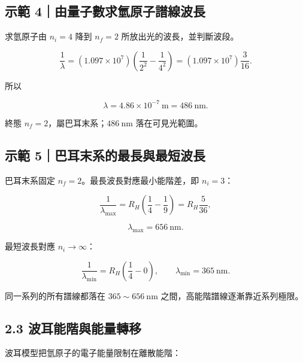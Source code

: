 \documentclass[11pt,a4paper]{article}
\begin{document}
\begin{HandoutWorkedExample}

\subsection{示範 4｜由量子數求氫原子譜線波長}\label{ux793aux7bc4-4ux7531ux91cfux5b50ux6578ux6c42ux6c2bux539fux5b50ux8b5cux7ddaux6ce2ux9577}

求氫原子由 \(n_i=4\) 降到 \(n_f=2\) 所放出光的波長，並判斷波段。

\[
\frac1\lambda
=(1.097\times10^7)
\left(\frac1{2^2}-\frac1{4^2}\right)
=(1.097\times10^7)\frac3{16}.
\]

所以

\[
\lambda=4.86\times10^{-7}\ \mathrm m=486\ \mathrm{nm}.
\]

終態 \(n_f=2\)，屬巴耳末系；\(486\ \mathrm{nm}\) 落在可見光範圍。

\end{HandoutWorkedExample}

\begin{HandoutWorkedExample}

\subsection{示範 5｜巴耳末系的最長與最短波長}\label{ux793aux7bc4-5ux5df4ux8033ux672bux7cfbux7684ux6700ux9577ux8207ux6700ux77edux6ce2ux9577}

巴耳末系固定 \(n_f=2\)。最長波長對應最小能階差，即 \(n_i=3\)：

\[
\frac1{\lambda_{\max}}
=R_H\left(\frac14-\frac19\right)
=R_H\frac5{36},
\]

\[
\lambda_{\max}=656\ \mathrm{nm}.
\]

最短波長對應 \(n_i\to\infty\)：

\[
\frac1{\lambda_{\min}}
=R_H\left(\frac14-0\right),
\qquad
\lambda_{\min}=365\ \mathrm{nm}.
\]

同一系列的所有譜線都落在 \(365\sim656\ \mathrm{nm}\) 之間，高能階譜線逐漸靠近系列極限。

\end{HandoutWorkedExample}

\subsection{2.3 波耳能階與能量轉移}\label{ux6ce2ux8033ux80fdux968eux8207ux80fdux91cfux8f49ux79fb}

波耳模型把氫原子的電子能量限制在離散能階：
\end{document}
